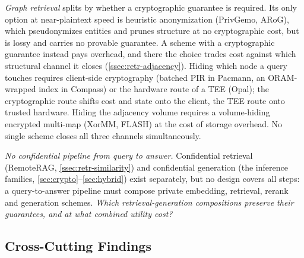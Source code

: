 \emph{Graph retrieval} splits by whether a cryptographic guarantee is required. Its only
option at near-plaintext speed is heuristic anonymization (PrivGemo, ARoG), which pseudonymizes entities
and prunes structure at no cryptographic cost, but is lossy and carries no provable guarantee. A
scheme with a cryptographic guarantee instead pays overhead, and there the choice trades cost
against which structural channel it closes (\cref{ssec:retr-adjacency}). Hiding which node a query
touches requires client-side cryptography (batched PIR in Pacmann, an ORAM-wrapped index in
Compass) or the hardware route of a TEE (Opal); the cryptographic route shifts cost and state
onto the client, the TEE route onto trusted hardware. Hiding the adjacency volume requires a
volume-hiding encrypted multi-map (XorMM, FLASH) at the cost of storage overhead. No single
scheme closes all three channels simultaneously.

\begin{openproblem}
\label{op:no-e2e}
\emph{No confidential pipeline from query to answer.} Confidential retrieval (RemoteRAG,
\cref{ssec:retr-similarity}) and confidential generation (the inference families,
\cref{sec:crypto}--\cref{sec:hybrid}) exist separately, but no design covers all steps: a
query-to-answer pipeline must compose private embedding, retrieval, rerank and generation schemes. \emph{Which retrieval-generation compositions preserve their
guarantees, and at what combined utility cost?}
\end{openproblem}

\subsection{Cross-Cutting Findings}
\label{ssec:findings}

